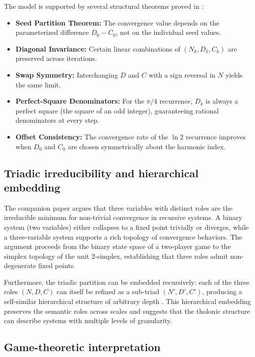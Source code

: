\documentclass[12pt]{article}
\begin{document}
The model is supported by several structural theorems proved in \cite{Mil24}:
\begin{itemize}
  \item \textbf{Seed Partition Theorem:} The convergence value depends on the
        parameterized difference $D_0 - C_0$, not on the individual seed values.
  \item \textbf{Diagonal Invariance:} Certain linear combinations of $(N_k, D_k, C_k)$
        are preserved across iterations.
  \item \textbf{Swap Symmetry:} Interchanging $D$ and $C$ with a sign reversal in $N$
        yields the same limit.
  \item \textbf{Perfect-Square Denominators:} For the $\pi/4$ recurrence, $D_k$ is
        always a perfect square (the square of an odd integer), guaranteeing rational
        denominators at every step.
  \item \textbf{Offset Consistency:} The convergence rate of the $\ln 2$ recurrence
        improves when $D_0$ and $C_0$ are chosen symmetrically about the harmonic index.
\end{itemize}

\subsection{Triadic irreducibility and hierarchical embedding}\label{sec:irreducibility}

The companion paper \cite{Mil26b} argues that three variables with distinct roles are
the irreducible minimum for non-trivial convergence in recursive systems.  A binary
system (two variables) either collapses to a fixed point trivially or diverges, while
a three-variable system supports a rich topology of convergence behaviors.  The argument
proceeds from the binary state space of a two-player game to the simplex topology of the
unit 2-simplex, establishing that three roles admit non-degenerate fixed points.

Furthermore, the triadic partition can be embedded recursively: each of the three roles
$(N, D, C)$ can itself be refined as a sub-triad $(N', D', C')$, producing a
self-similar hierarchical structure of arbitrary depth \cite[Section~8]{Mil24}.  This
hierarchical embedding preserves the semantic roles across scales and suggests that the
tholonic structure can describe systems with multiple levels of granularity.

\subsection{Game-theoretic interpretation}\label{sec:game-theory}
\end{document}
